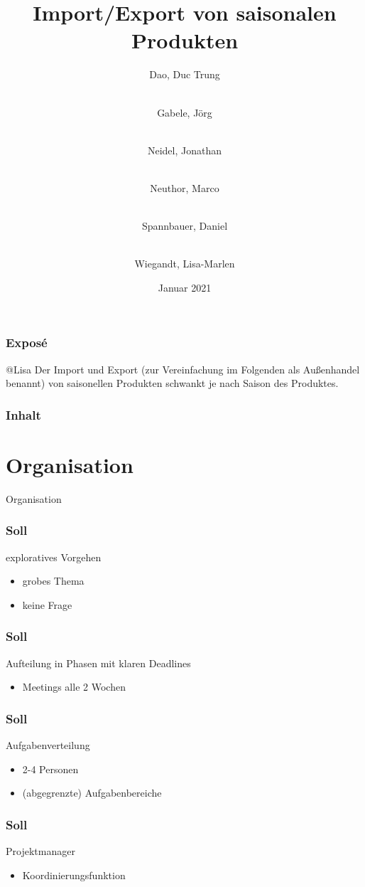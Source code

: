 \documentclass{beamer}
\title{Import/Export von saisonalen Produkten}
\author[Dao, Gabele, Neidel, Neuthor, Spannbauer, Wiegandt]{
  Dao, Duc Trung \and\\
  Gabele, Jörg \and\\
  Neidel, Jonathan \and\\
  Neuthor, Marco \and\\
  Spannbauer, Daniel \and\\
  Wiegandt, Lisa-Marlen
}
\date{Januar 2021}
\institute{HTW Berlin, Angewandte Informatik}
\begin{document}
\frame{\titlepage}

\begin{frame}
\frametitle{Exposé}
	@Lisa
	Der Import und Export (zur Vereinfachung im Folgenden als Außenhandel benannt) von saisonellen Produkten schwankt je nach Saison des Produktes.

\end{frame}

\begin{frame}
\frametitle{Inhalt}
\tableofcontents
\end{frame}


\section{Organisation}

\begin{frame}
	\begin{center}
	{\Huge Organisation}
	\end{center}
\end{frame}

\begin{frame}
\frametitle{Soll}
exploratives Vorgehen

  \begin{itemize}
    \item grobes Thema
    \item keine Frage
  \end{itemize}
\end{frame}

\begin{frame}
\frametitle{Soll}
Aufteilung in Phasen mit klaren Deadlines

  \begin{itemize}
    \item Meetings alle 2 Wochen
  \end{itemize}

\end{frame}

\begin{frame}
\frametitle{Soll}
Aufgabenverteilung
  \begin{itemize}
    \item 2-4 Personen
    \item (abgegrenzte) Aufgabenbereiche
  \end{itemize}
\end{frame}

\begin{frame}
\frametitle{Soll}
Projektmanager
  \begin{itemize}
    \item Koordinierungsfunktion
  \end{itemize}

\end{frame}
\end{document}
